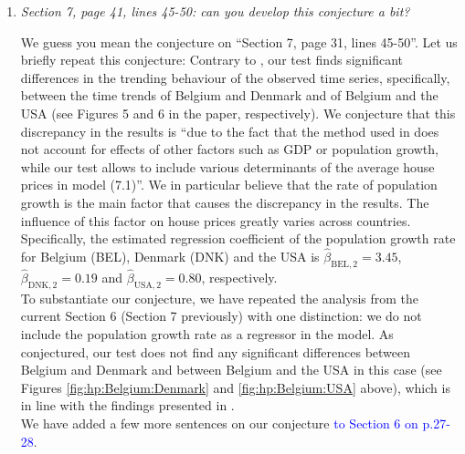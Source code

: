 \documentclass[a4paper,12pt]{article}
\begin{document}
\begin{enumerate}[label=\arabic*.,leftmargin=0.6cm]
\item \textit{Section 7, page 41, lines 45-50: can you develop this conjecture a bit?}

We guess you mean the conjecture on ``Section 7, page 31, lines 45-50''. Let us briefly repeat this conjecture: Contrary to \cite{Knoll2017}, our test finds significant differences in the trending behaviour of the observed time series, specifically, between the time trends of Belgium and Denmark and of Belgium and the USA (see Figures 5 and 6 in the paper, respectively). We conjecture that this discrepancy in the results is ``due to the fact that the method used in \cite{Knoll2017} does not account for effects of other factors such as GDP or population growth, while our test allows to include various determinants of the average house prices in model (7.1)''. We in particular believe that the rate of population growth is the main factor that causes the discrepancy in the results. The influence of this factor on house prices greatly varies across countries. Specifically, the estimated regression coefficient of the population growth rate for Belgium (BEL), Denmark (DNK) and the USA is $\widehat{\beta}_{\text{BEL}, 2} = 3.45$, $\widehat{\beta}_{\text{DNK}, 2} = 0.19$ and $\widehat{\beta}_{\text{USA}, 2} = 0.80$, respectively. \\
To substantiate our conjecture, we have repeated the analysis from the current Section 6 (Section 7 previously) with one distinction: we do not include the population growth rate as a regressor in the model.
As conjectured, our test does not find any significant differences between Belgium and Denmark and between Belgium and the USA in this case (see Figures \ref{fig:hp:Belgium:Denmark} and \ref{fig:hp:Belgium:USA} above), which is in line with the findings presented in \cite{Knoll2017}. \\
We have added a few more sentences on our conjecture \textcolor{blue}{to Section 6 on p.27-28}. 


\end{enumerate}
\end{document}
